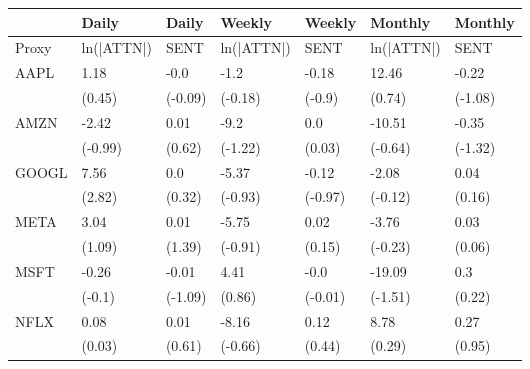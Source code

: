 \begin{tabular}{lllllll}
\toprule
{} &       Daily &    Daily &      Weekly &   Weekly &     Monthly &  Monthly \\
\midrule
Proxy &  ln(|ATTN|) &     SENT &  ln(|ATTN|) &     SENT &  ln(|ATTN|) &     SENT \\
AAPL  &        1.18 &     -0.0 &        -1.2 &    -0.18 &       12.46 &    -0.22 \\
      &      (0.45) &  (-0.09) &     (-0.18) &   (-0.9) &      (0.74) &  (-1.08) \\
AMZN  &       -2.42 &     0.01 &        -9.2 &      0.0 &      -10.51 &    -0.35 \\
      &     (-0.99) &   (0.62) &     (-1.22) &   (0.03) &     (-0.64) &  (-1.32) \\
GOOGL &        7.56 &      0.0 &       -5.37 &    -0.12 &       -2.08 &     0.04 \\
      &      (2.82) &   (0.32) &     (-0.93) &  (-0.97) &     (-0.12) &   (0.16) \\
META  &        3.04 &     0.01 &       -5.75 &     0.02 &       -3.76 &     0.03 \\
      &      (1.09) &   (1.39) &     (-0.91) &   (0.15) &     (-0.23) &   (0.06) \\
MSFT  &       -0.26 &    -0.01 &        4.41 &     -0.0 &      -19.09 &      0.3 \\
      &      (-0.1) &  (-1.09) &      (0.86) &  (-0.01) &     (-1.51) &   (0.22) \\
NFLX  &        0.08 &     0.01 &       -8.16 &     0.12 &        8.78 &     0.27 \\
      &      (0.03) &   (0.61) &     (-0.66) &   (0.44) &      (0.29) &   (0.95) \\
\bottomrule
\end{tabular}
